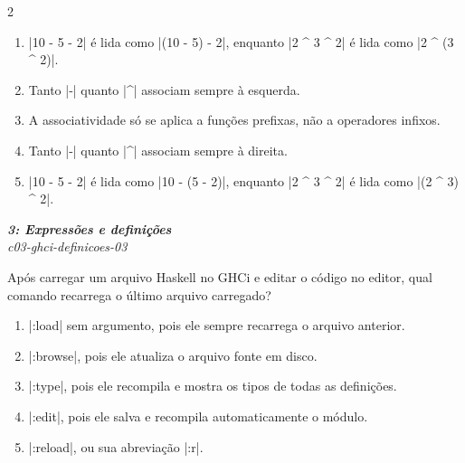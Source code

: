 \documentclass[a4paper,10pt,brazil]{article}
\begin{document}
\begin{multicols}{2}
\begin{enumerate}
  \item \haskellinline|10 - 5 - 2| é lida como \haskellinline|(10 - 5) - 2|, enquanto \haskellinline|2 ^ 3 ^ 2| é lida como \haskellinline|2 ^ (3 ^ 2)|.

  \item Tanto \haskellinline|-| quanto \haskellinline|^| associam sempre à esquerda.

  \item A associatividade só se aplica a funções prefixas, não a operadores infixos.

  \item Tanto \haskellinline|-| quanto \haskellinline|^| associam sempre à direita.

  \item \haskellinline|10 - 5 - 2| é lida como \haskellinline|10 - (5 - 2)|, enquanto \haskellinline|2 ^ 3 ^ 2| é lida como \haskellinline|(2 ^ 3) ^ 2|.


\end{enumerate}

\begin{flushright}
  \footnotesize
  \textit{\textbf{3: Expressões e definições}}\\
  \textit{c03-ghci-definicoes-03}\\

\end{flushright}
Após carregar um arquivo Haskell no GHCi e editar o código no editor, qual comando recarrega o último arquivo carregado?

\begin{enumerate}
  \item \haskellinline|:load| sem argumento, pois ele sempre recarrega o arquivo anterior.

  \item \haskellinline|:browse|, pois ele atualiza o arquivo fonte em disco.

  \item \haskellinline|:type|, pois ele recompila e mostra os tipos de todas as definições.

  \item \haskellinline|:edit|, pois ele salva e recompila automaticamente o módulo.

  \item \haskellinline|:reload|, ou sua abreviação \haskellinline|:r|.


\end{enumerate}


\end{multicols}
\end{document}
